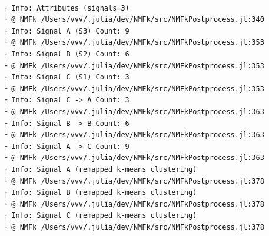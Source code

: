 \documentclass[11pt]{article}
\begin{document}
    
    \begin{center}
    \end{center}
    { \hspace*{\fill} \\}
    
    \begin{Verbatim}[commandchars=\\\{\}]

    \end{Verbatim}

    \begin{Verbatim}[commandchars=\\\{\}]
┌ Info: Attributes (signals=3)
└ @ NMFk /Users/vvv/.julia/dev/NMFk/src/NMFkPostprocess.jl:340
┌ Info: Signal A (S3) Count: 9
└ @ NMFk /Users/vvv/.julia/dev/NMFk/src/NMFkPostprocess.jl:353
┌ Info: Signal B (S2) Count: 6
└ @ NMFk /Users/vvv/.julia/dev/NMFk/src/NMFkPostprocess.jl:353
┌ Info: Signal C (S1) Count: 3
└ @ NMFk /Users/vvv/.julia/dev/NMFk/src/NMFkPostprocess.jl:353
┌ Info: Signal C -> A Count: 3
└ @ NMFk /Users/vvv/.julia/dev/NMFk/src/NMFkPostprocess.jl:363
┌ Info: Signal B -> B Count: 6
└ @ NMFk /Users/vvv/.julia/dev/NMFk/src/NMFkPostprocess.jl:363
┌ Info: Signal A -> C Count: 9
└ @ NMFk /Users/vvv/.julia/dev/NMFk/src/NMFkPostprocess.jl:363
┌ Info: Signal A (remapped k-means clustering)
└ @ NMFk /Users/vvv/.julia/dev/NMFk/src/NMFkPostprocess.jl:378
┌ Info: Signal B (remapped k-means clustering)
└ @ NMFk /Users/vvv/.julia/dev/NMFk/src/NMFkPostprocess.jl:378
┌ Info: Signal C (remapped k-means clustering)
└ @ NMFk /Users/vvv/.julia/dev/NMFk/src/NMFkPostprocess.jl:378
    \end{Verbatim}

    \begin{center}
    \end{center}
    { \hspace*{\fill} \\}
    
    \begin{Verbatim}[commandchars=\\\{\}]

    \end{Verbatim}

    \begin{center}
    \end{center}
    { \hspace*{\fill} \\}
    
\end{document}
